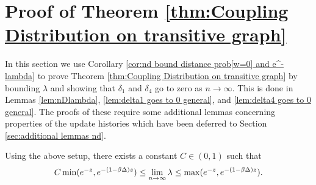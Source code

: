 \section{Proof of Theorem \ref{thm:Coupling Distribution on transitive graph}}
\label{sec:proof thm coupling nd}
	In this section we use Corollary \ref{cor:nd bound distance prob[w=0] and e^-lambda} to prove Theorem \ref{thm:Coupling Distribution on transitive graph} by bounding $\lambda$ and showing that $\delta_1$ and $\delta_4$ go to zero as $n \rightarrow \infty$. This is done in Lemmas \ref{lem:nDlambda}, \ref{lem:delta1 goes to 0 general}, and \ref{lem:delta4 goes to 0 general}. The proofs of these require some additional lemmas concerning properties of the update histories which have been deferred to Section \ref{sec:additional lemmas nd}.
	\begin{lemma}
	\label{lem:nDlambda}
		Using the above setup, there exists a constant $C \in (0,1)$ such that
		\begin{equation}
			 C \min(e^{-z}, e^{-(1 - \beta\Delta)z}) \leq \lim_{n \rightarrow \infty} \lambda \leq \max(e^{-z}, e^{-(1 - \beta\Delta)z}).
		\end{equation}
	\end{lemma}
